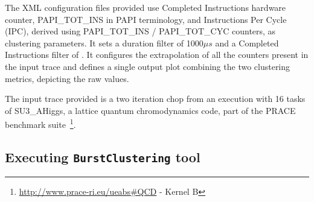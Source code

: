 \documentclass[twoside,a4,english,11pt]{book}
\begin{document}
\begin{table}
  \centering
  
  \caption{Contents of \texttt{share/example} directory}
  \label{tab:example_directory}
  
  
\end{table}

The XML configuration files provided use Completed Instructions hardware counter,
PAPI\_TOT\_INS in PAPI terminology, and Instructions Per Cycle (IPC), derived using 
PAPI\_TOT\_INS / PAPI\_TOT\_CYC counters, as clustering parameters. It sets a 
duration filter of 1000$\mu s$ and a Completed Instructions filter of . 
It configures the extrapolation of all the counters present in the input trace
and defines a single output plot combining the two clustering metrics, depicting
the raw values.

The input trace provided is a two iteration chop from an execution with 16 tasks
of \textsf{SU3\_AHiggs}, a lattice quantum chromodynamics code, part of the PRACE
benchmark suite~\footnote{\url{http://www.prace-ri.eu/ueabs\#QCD} - Kernel B}.

\subsection{Executing \texttt{BurstClustering} tool}
\end{document}
